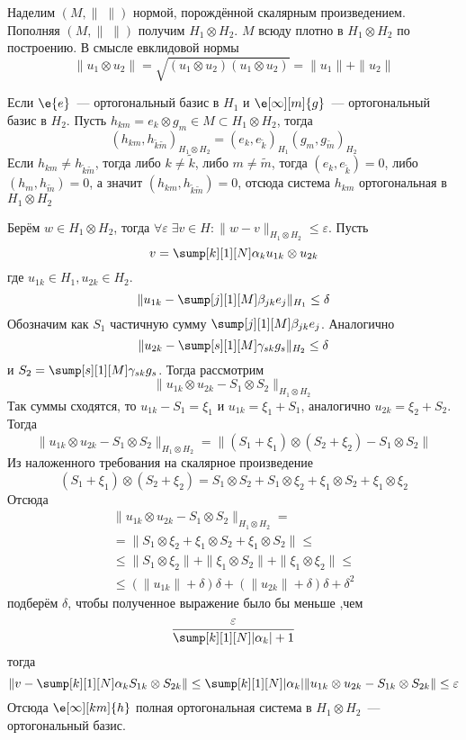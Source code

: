 \documentclass[14pt]{extarticle}
\begin{document}
Наделим $(M, \|\;\|)$ нормой, порождённой скалярным произведением.
Пополняя $(M, \|\;\|)$ получим $H_1 \otimes H_2$.
$M$ всюду плотно в $H_1 \otimes H_2$ по построению.
В смысле евклидовой нормы
$$
\|u_1 \otimes u_2\| = \sqrt{(u_1 \otimes u_2)(u_1 \otimes u_2)} = \|u_1\| + \|u_2\|
$$

Если $\e{e}$~--- ортогональный базис в $H_1$ и $\e[\infty][m]{g}$~--- ортогональный
базис в $H_2$.
Пусть $h_{km} = e_k \otimes g_m \in M \subset H_1 \otimes H_2$, тогда
$$
(h_{km}, h_{\tilde{k}\tilde{m}})_{H_1 \otimes H_2} = (e_k, e_{\tilde{k}})_{H_1}
(g_m, g_{\tilde{m}})_{H_2}
$$
Если $h_{km} \ne h_{\tilde{k}\tilde{m}}$, тогда либо $k \ne \tilde{k}$, либо
$m \ne \tilde{m}$, тогда $(e_k, e_{\tilde{k}}) = 0$, либо $(h_m, h_{\tilde{m}}) = 0$, а значит
$(h_{km},h_{\tilde{k}\tilde{m}}) = 0$, отсюда система $h_{km}$ ортогональная в $H_1
\otimes H_2$

Берём $w \in H_1 \otimes H_2$, тогда $\forall \varepsilon\; \exists v \in H\colon \|w - v\|
_{H_1 \otimes H_2} \le \varepsilon$.
Пусть
$$
v = \sump[k][1][N] \alpha_k u_{1k} \otimes u_{2k}
$$
где $u_{1k} \in H_1, u_{2k} \in H_2$.
$$
\|u_{1k} - \sump[j][1][M]\beta_{jk}e_j\|_{H_1} \le \delta
$$
Обозначим как $S_1$ частичную сумму $\sump[j][1][M]\beta_{jk}e_j$.
Аналогично
$$
\|u_{2k} - \sump[s][1][M]\gamma_{sk}g_s\|_{H_2} \le \delta
$$
и $S_2 = \sump[s][1][M]\gamma_{sk}g_s$.
Тогда рассмотрим
$$
\|u_{1k} \otimes u_{2k} - S_1 \otimes S_2\|_{H_1 \otimes H_2}
$$
Так суммы сходятся, то $u_{1k} - S_1 = \xi_1$ и $u_{1k} = \xi_1 + S_1$, аналогично
$u_{2k} = \xi_2 + S_2$.
Тогда
$$
\|u_{1k} \otimes u_{2k} - S_1 \otimes S_2\|_{H_1 \otimes H_2} = \|(S_1 + \xi_1) \otimes
(S_2 + \xi_2) - S_1 \otimes S_2\|
$$
Из наложенного требования на скалярное произведение
$$
(S_1 + \xi_1) \otimes (S_2 + \xi_2) = S_1 \otimes S_2 +S_1 \otimes \xi_2 + \xi_1 \otimes S_2 +
\xi_1 \otimes \xi_2
$$
Отсюда
\begin{multline*}
\|u_{1k} \otimes u_{2k} - S_1 \otimes S_2\|_{H_1 \otimes H_2} =\\=
\|S_1 \otimes \xi_2 + \xi_1 \otimes S_2 + \xi_1 \otimes S_2\| \le\\\le
\|S_1 \otimes \xi_2\| + \|\xi_1 \otimes S_2\| + \|\xi_1 \otimes \xi_2\| \le\\\le
(\|u_{1k}\| + \delta)\delta + (\|u_{2k}\| + \delta)\delta + \delta^2
\end{multline*}
подберём $\delta$, чтобы полученное выражение было бы меньше ,чем
$$
\dfrac{\varepsilon}{\sump[k][1][N]|\alpha_k| + 1}
$$
тогда
$$
\|v - \sump[k][1][N] \alpha_k S_{1k} \otimes S_{2k}\| \le \sump[k][1][N]|\alpha_k|
\|u_{1k} \otimes u_{2k} - S_{1k} \otimes S_{2k}\| \le \varepsilon
$$
Отсюда $\e[\infty][km]{h}$ полная ортогональная система в $H_1 \otimes 
H_2$~--- ортогональный базис.
\end{document}
